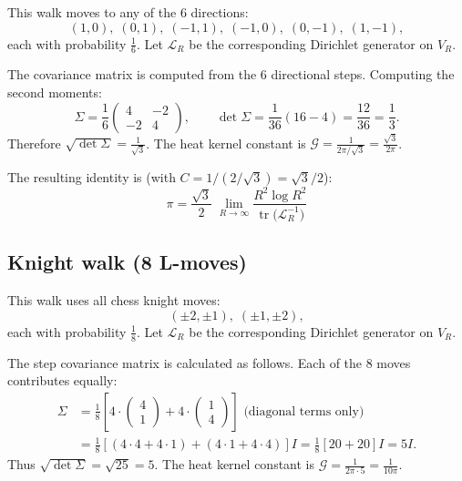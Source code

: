 \documentclass[12pt]{amsart}
\theoremstyle{definition}
\theoremstyle{remark}
\newcommand{\cG}{\mathcal{G}}    %
\DeclareMathOperator{\tr}{tr}    %
\begin{document}
This walk moves to any of the 6 directions:
\[
(1,0),\;(0,1),\;(-1,1),\;(-1,0),\;(0,-1),\;(1,-1),
\]
each with probability \( \tfrac16 \). Let $\mathcal{L}_R$ be the corresponding Dirichlet generator on $V_R$.

The covariance matrix is computed from the 6 directional steps. Computing the second moments:
\[
\Sigma
=\frac{1}{6}
\begin{pmatrix}
4 & -2 \\
-2 & 4
\end{pmatrix},
\qquad
\det\Sigma = \frac{1}{36}(16 - 4) = \frac{12}{36} = \frac{1}{3}.
\]
Therefore $\sqrt{\det\Sigma} = \frac{1}{\sqrt{3}}$.
The heat kernel constant is $\cG = \frac{1}{2\pi/\sqrt{3}} = \frac{\sqrt{3}}{2\pi}$.

The resulting identity is (with $C = 1/(2/\sqrt{3}) = \sqrt{3}/2$):
\begin{equation}\label{eq:Tri_pi}
\boxed{\;
\displaystyle
\pi
=\frac{\sqrt{3}}{2}\;
   \lim_{R\to\infty}
          \frac{R^{2}\log R^{2}}
               {\tr\!\bigl(\mathcal{L}_R^{-1}\bigr)}
   \;}
\end{equation}


\subsection{Knight walk (8 L-moves)}\label{app:knight}

This walk uses all chess knight moves:
\[
(\pm2,\pm1),\;(\pm1,\pm2),
\]
each with probability \( \tfrac{1}{8} \). Let $\mathcal{L}_R$ be the corresponding Dirichlet generator on $V_R$.

The step covariance matrix is calculated as follows. Each of the 8 moves contributes equally:
\begin{align}
\Sigma &= \frac{1}{8}\left[4 \cdot \begin{pmatrix} 4 \\ 1 \end{pmatrix} + 4 \cdot \begin{pmatrix} 1 \\ 4 \end{pmatrix}\right] \text{ (diagonal terms only)}\\
&= \frac{1}{8}[(4 \cdot 4 + 4 \cdot 1) + (4 \cdot 1 + 4 \cdot 4)]I = \frac{1}{8}[20 + 20]I = 5I.
\end{align}
Thus $\sqrt{\det\Sigma} = \sqrt{25} = 5$.
The heat kernel constant is $\cG = \frac{1}{2\pi \cdot 5} = \frac{1}{10\pi}$.
\end{document}
